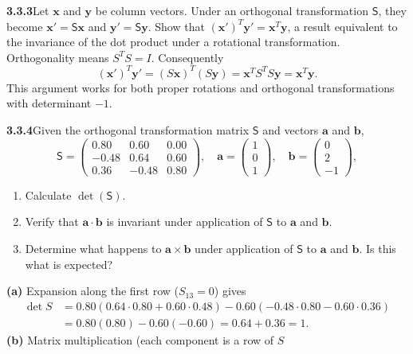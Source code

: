 \par\bigskip
\noindent\textbf{3.3.3}\quad Let $\mathbf{x}$ and $\mathbf{y}$ be column
vectors. Under an orthogonal transformation $\mathsf{S}$, they become
$\mathbf{x}'=\mathsf{S}\mathbf{x}$ and $\mathbf{y}'=\mathsf{S}\mathbf{y}$.
Show that $(\mathbf{x}')^{T}\mathbf{y}'=\mathbf{x}^{T}\mathbf{y}$, a result
equivalent to the invariance of the dot product under a rotational
transformation.
\solution
Orthogonality means $S^TS=I$. Consequently
\[
(\mathbf x')^T\mathbf y'
=(S\mathbf x)^T(S\mathbf y)
=\mathbf x^TS^TS\mathbf y
=\boxed{\mathbf x^T\mathbf y}.
\]
This argument works for both proper rotations and orthogonal
transformations with determinant $-1$.

\par\bigskip
\noindent\textbf{3.3.4}\quad Given the orthogonal transformation matrix
$\mathsf{S}$ and vectors $\mathbf{a}$ and $\mathbf{b}$,
\[
\mathsf{S}=\begin{pmatrix}0.80&0.60&0.00\\-0.48&0.64&0.60\\
0.36&-0.48&0.80\end{pmatrix},\quad
\mathbf{a}=\begin{pmatrix}1\\0\\1\end{pmatrix},\quad
\mathbf{b}=\begin{pmatrix}0\\2\\-1\end{pmatrix},
\]
\begin{enumerate}
\item[(a)] Calculate $\det(\mathsf{S})$.
\item[(b)] Verify that $\mathbf{a}\cdot\mathbf{b}$ is invariant under
  application of $\mathsf{S}$ to $\mathbf{a}$ and $\mathbf{b}$.
\item[(c)] Determine what happens to $\mathbf{a}\times\mathbf{b}$ under
  application of $\mathsf{S}$ to $\mathbf{a}$ and $\mathbf{b}$. Is this what
  is expected?
\end{enumerate}
\solution
\textbf{(a)} Expansion along the first row ($S_{13}=0$) gives
\[
\begin{aligned}
\det S&=0.80(0.64\cdot0.80+0.60\cdot0.48)
-0.60(-0.48\cdot0.80-0.60\cdot0.36)\\
&=0.80(0.80)-0.60(-0.60)=0.64+0.36=\boxed{1}.
\end{aligned}
\]
\textbf{(b)} Matrix multiplication (each component is a row of $S$
